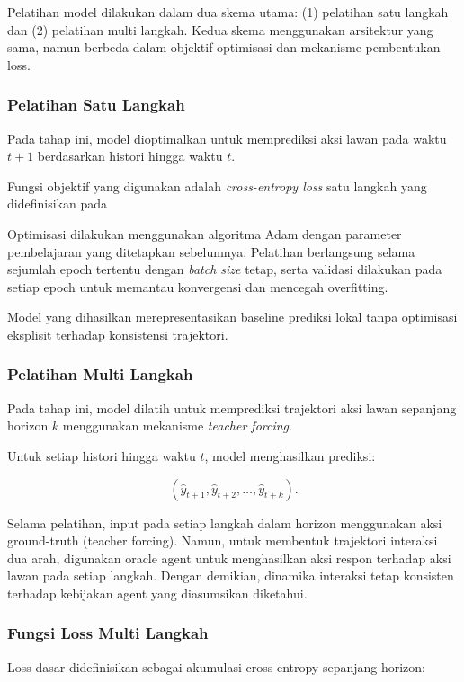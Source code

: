 Pelatihan model dilakukan dalam dua skema utama: (1) pelatihan satu langkah dan (2) pelatihan multi langkah. Kedua skema menggunakan arsitektur yang sama, namun berbeda dalam objektif optimisasi dan mekanisme pembentukan loss.

\subsubsection{Pelatihan Satu Langkah}

Pada tahap ini, model dioptimalkan untuk memprediksi aksi lawan pada waktu $t+1$ berdasarkan histori hingga waktu $t$.

Fungsi objektif yang digunakan adalah \textit{cross-entropy loss} satu langkah yang didefinisikan pada 

Optimisasi dilakukan menggunakan algoritma Adam dengan parameter pembelajaran yang ditetapkan sebelumnya. Pelatihan berlangsung selama sejumlah epoch tertentu dengan \textit{batch size} tetap, serta validasi dilakukan pada setiap epoch untuk memantau konvergensi dan mencegah overfitting.

Model yang dihasilkan merepresentasikan baseline prediksi lokal tanpa optimisasi eksplisit terhadap konsistensi trajektori.

\subsubsection{Pelatihan Multi Langkah}

Pada tahap ini, model dilatih untuk memprediksi trajektori aksi lawan sepanjang horizon $k$ menggunakan mekanisme \textit{teacher forcing}. 

Untuk setiap histori hingga waktu $t$, model menghasilkan prediksi:

\[
(\hat{y}_{t+1}, \hat{y}_{t+2}, \dots, \hat{y}_{t+k}).
\]

Selama pelatihan, input pada setiap langkah dalam horizon menggunakan aksi ground-truth (teacher forcing). Namun, untuk membentuk trajektori interaksi dua arah, digunakan oracle agent untuk menghasilkan aksi respon terhadap aksi lawan pada setiap langkah. Dengan demikian, dinamika interaksi tetap konsisten terhadap kebijakan agent yang diasumsikan diketahui.

\subsubsection{Fungsi Loss Multi Langkah}

Loss dasar didefinisikan sebagai akumulasi cross-entropy sepanjang horizon:

